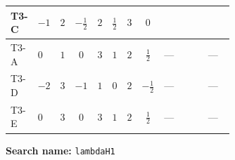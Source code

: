 \documentclass[8pt]{article}
\begin{document}
\begin{landscape}
\begin{longtable}{@{}llcccccc >{\raggedright\arraybackslash}p{0.21\linewidth} >{\raggedright\arraybackslash}p{0.21\linewidth} >{\raggedright\arraybackslash}p{0.21\linewidth}@{}}
T3-C & $-1$ & $2$ & $-\frac{1}{2}$ & $2$ & $\frac{1}{2}$ & $3$ & $0$ & \scriptsize\adjustbox{max width=\linewidth}{$\begin{gathered} +{\lambda_{H H^\dagger S_1^\dagger S_2^\dagger}^{\rm Cross}} (4 \left({\lambda_{H H^\dagger S_1^\dagger S_2^\dagger}^{\rm Cross}}\right)^{*}+3 \left({\lambda_{S_1 S_1^{\dagger 2}S_2^\dagger}}\right)^{*})\end{gathered}$} & \scriptsize\adjustbox{max width=\linewidth}{$\begin{gathered} +6 {\lambda_{T3}} \left({\lambda_{T3}}\right)^{*}\end{gathered}$} & \scriptsize\adjustbox{max width=\linewidth}{$\begin{gathered} +\frac{9 {g_2}^4}{4}\end{gathered}$} \\
\midrule
T3-A & $0$ & $1$ & $0$ & $3$ & $1$ & $2$ & $\frac{1}{2}$ & --- & \scriptsize\adjustbox{max width=\linewidth}{$\begin{gathered} +12 {\lambda_{T3}} \left({\lambda_{T3}}\right)^{*}\end{gathered}$} & --- \\
\midrule
T3-D & $-2$ & $3$ & $-1$ & $1$ & $0$ & $2$ & $-\frac{1}{2}$ & --- & \scriptsize\adjustbox{max width=\linewidth}{$\begin{gathered} +4 {\lambda_{T3}} \left({\lambda_{T3}}\right)^{*}\end{gathered}$} & --- \\
\midrule
T3-E & $0$ & $3$ & $0$ & $3$ & $1$ & $2$ & $\frac{1}{2}$ & --- & \scriptsize\adjustbox{max width=\linewidth}{$\begin{gathered} +4 {\lambda_{T3}} \left({\lambda_{T3}}\right)^{*}\end{gathered}$} & --- \\
\midrule
\bottomrule
\end{longtable}
\clearpage
\noindent\textbf{Search name: }\texttt{lambdaH1}\par\smallskip

\end{landscape}
\end{document}

